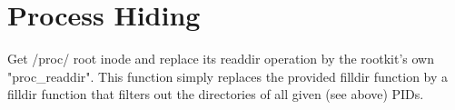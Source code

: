 \section{Process Hiding}
Get /proc/ root inode and replace its readdir operation by the rootkit's own
"proc\_readdir". This function simply replaces the provided filldir function 
by a filldir function that filters out the directories of all given (see 
above) PIDs. 